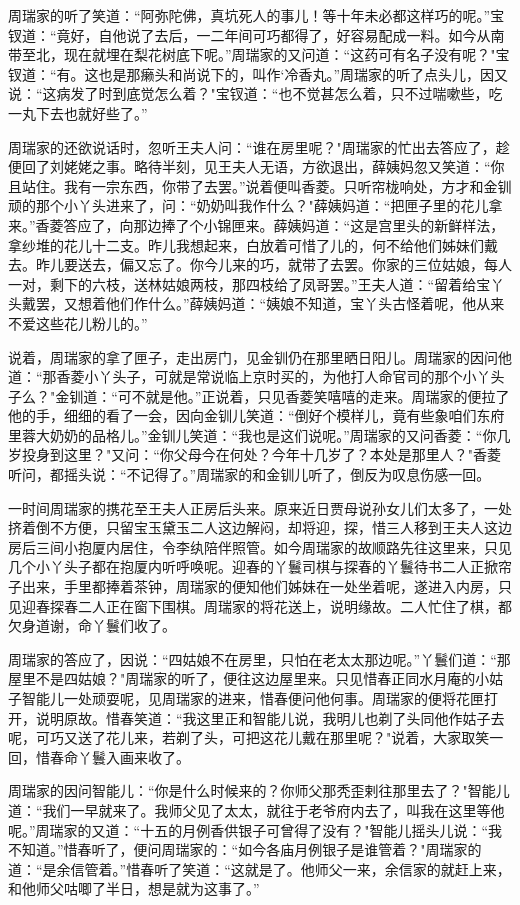 周瑞家的听了笑道：“阿弥陀佛，真坑死人的事儿！等十年未必都这样巧的呢。”宝钗道：“竟好，自他说了去后，一二年间可巧都得了，好容易配成一料。如今从南带至北，现在就埋在梨花树底下呢。”周瑞家的又问道：“这药可有名子没有呢？"宝钗道：“有。这也是那癞头和尚说下的，叫作`冷香丸。”周瑞家的听了点头儿，因又说：“这病发了时到底觉怎么着？"宝钗道：“也不觉甚怎么着，只不过喘嗽些，吃一丸下去也就好些了。”

周瑞家的还欲说话时，忽听王夫人问：“谁在房里呢？"周瑞家的忙出去答应了，趁便回了刘姥姥之事。略待半刻，见王夫人无语，方欲退出，薛姨妈忽又笑道：“你且站住。我有一宗东西，你带了去罢。”说着便叫香菱。只听帘栊响处，方才和金钏顽的那个小丫头进来了，问：“奶奶叫我作什么？"薛姨妈道：“把匣子里的花儿拿来。”香菱答应了，向那边捧了个小锦匣来。薛姨妈道：“这是宫里头的新鲜样法，拿纱堆的花儿十二支。昨儿我想起来，白放着可惜了儿的，何不给他们姊妹们戴去。昨儿要送去，偏又忘了。你今儿来的巧，就带了去罢。你家的三位姑娘，每人一对，剩下的六枝，送林姑娘两枝，那四枝给了凤哥罢。”王夫人道：“留着给宝丫头戴罢，又想着他们作什么。”薛姨妈道：“姨娘不知道，宝丫头古怪着呢，他从来不爱这些花儿粉儿的。”

说着，周瑞家的拿了匣子，走出房门，见金钏仍在那里晒日阳儿。周瑞家的因问他道：“那香菱小丫头子，可就是常说临上京时买的，为他打人命官司的那个小丫头子么？"金钏道：“可不就是他。”正说着，只见香菱笑嘻嘻的走来。周瑞家的便拉了他的手，细细的看了一会，因向金钏儿笑道：“倒好个模样儿，竟有些象咱们东府里蓉大奶奶的品格儿。”金钏儿笑道：“我也是这们说呢。”周瑞家的又问香菱：“你几岁投身到这里？"又问：“你父母今在何处？今年十几岁了？本处是那里人？"香菱听问，都摇头说：“不记得了。”周瑞家的和金钏儿听了，倒反为叹息伤感一回。

一时间周瑞家的携花至王夫人正房后头来。原来近日贾母说孙女儿们太多了，一处挤着倒不方便，只留宝玉黛玉二人这边解闷，却将迎，探，惜三人移到王夫人这边房后三间小抱厦内居住，令李纨陪伴照管。如今周瑞家的故顺路先往这里来，只见几个小丫头子都在抱厦内听呼唤呢。迎春的丫鬟司棋与探春的丫鬟待书二人正掀帘子出来，手里都捧着茶钟，周瑞家的便知他们姊妹在一处坐着呢，遂进入内房，只见迎春探春二人正在窗下围棋。周瑞家的将花送上，说明缘故。二人忙住了棋，都欠身道谢，命丫鬟们收了。

周瑞家的答应了，因说：“四姑娘不在房里，只怕在老太太那边呢。”丫鬟们道：“那屋里不是四姑娘？"周瑞家的听了，便往这边屋里来。只见惜春正同水月庵的小姑子智能儿一处顽耍呢，见周瑞家的进来，惜春便问他何事。周瑞家的便将花匣打开，说明原故。惜春笑道：“我这里正和智能儿说，我明儿也剃了头同他作姑子去呢，可巧又送了花儿来，若剃了头，可把这花儿戴在那里呢？"说着，大家取笑一回，惜春命丫鬟入画来收了。

周瑞家的因问智能儿：“你是什么时候来的？你师父那秃歪剌往那里去了？"智能儿道：“我们一早就来了。我师父见了太太，就往于老爷府内去了，叫我在这里等他呢。”周瑞家的又道：“十五的月例香供银子可曾得了没有？"智能儿摇头儿说：“我不知道。”惜春听了，便问周瑞家的：“如今各庙月例银子是谁管着？"周瑞家的道：“是余信管着。”惜春听了笑道：“这就是了。他师父一来，余信家的就赶上来，和他师父咕唧了半日，想是就为这事了。”

